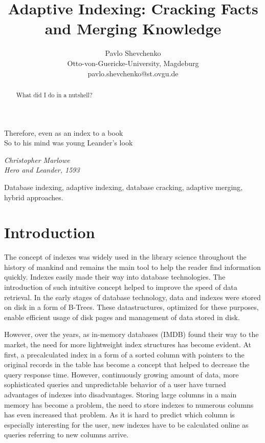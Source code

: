\documentclass[10pt, conference, compsocconf]{IEEEtran}
\begin{document}
\title{Adaptive Indexing: Cracking Facts and Merging Knowledge}
\author{Pavlo Shevchenko \\ Otto-von-Guericke-University, Magdeburg \\ pavlo.shevchenko@st.ovgu.de}

\maketitle

\epigraph{Therefore, even as an index to a book \\
So to his mind was young Leander's look}{\textit{Christopher Marlowe\\Hero and Leander, 1593}}

\begin{abstract}
What did I do in a nutshell?\\
\end{abstract}

\begin{IEEEkeywords}
Database indexing, adaptive indexing, database cracking, adaptive merging, hybrid approaches.
\end{IEEEkeywords}

\section{Introduction}
The concept of indexes was widely used in the library science throughout the history of mankind and remains the main tool to help the reader find information quickly. Indexes easily made their way into database technologies. The introduction of such intuitive concept helped to improve the speed of data retrieval. In the early stages of database technology, data and indexes were stored on disk in a form of B-Trees. These datastructures, optimized for these purposes, enable efficient usage of disk pages and management of data stored in disk.

However, over the years, as in-memory databases (IMDB) found their way to the market, the need for more lightweight index structures has become evident. At first, a precalculated index in a form of a sorted column with pointers to the original records in the table has become a concept that helped to decrease the query response time. However, continuously growing amount of data, more sophisticated queries and unpredictable behavior of a user have turned advantages of indexes into disadvantages\cite{partial2}. Storing large columns in a main memory has become a problem, the need to store indexes to numerous columns has even increased that problem. As it is hard to predict which column is especially interesting for the user, new indexes have to be calculated online as queries referring to new columns arrive.
\end{document}
